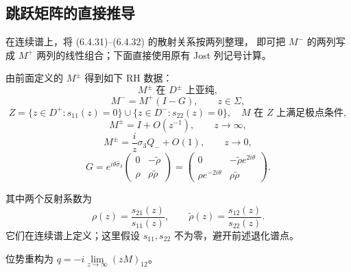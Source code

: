 \documentclass[lang=cn,scheme=chinese,mode=simple,device=normal,color=blue,
math=cm,thmcnt=section,12pt]{elegantbook}
\newcommand{\eqq}[2]{\tag{#1}\label{eq:#1}#2}
\begin{document}
\subsection{跳跃矩阵的直接推导}
在连续谱上，将 (6.4.31)--(6.4.32) 的散射关系按两列整理，
即可把 $M^-$ 的两列写成 $M^+$ 两列的线性组合；下面直接使用原有 Jost 列记号计算。
\setcounter{theorem}{2}
\begin{theorem}[简单极点的广义 RH 问题]
    由前面定义的 $M^\pm$ 得到如下 RH 数据：
    \begin{equation}\eqq{6.5.4}{M^\pm\text{ 在 }D^\pm\text{ 上亚纯},}\end{equation}
    \begin{equation}\eqq{6.5.5}{M^-=M^+(I-G),\qquad z\in\Sigma,}\end{equation}
    \begin{equation}\eqq{6.5.6}{Z=\{z\in D^+:s_{11}(z)=0\}\cup\{z\in D^-:s_{22}(z)=0\},
            \quad M\text{ 在 }Z\text{ 上满足极点条件},}\end{equation}
    \begin{equation}\eqq{6.5.7}{M^\pm=I+O(z^{-1}),\qquad z\to\infty,}\end{equation}
    \begin{equation}\eqq{6.5.8}{M^\pm=\dfrac{i}{z}\sigma_3Q_-+O(1),\qquad z\to0,}\end{equation}
    \begin{equation}\eqq{6.5.9}{G=e^{i\theta\widehat\sigma_3}
            \begin{pmatrix}0&-\widetilde\rho\\\rho&\rho\widetilde\rho\end{pmatrix}
            =\begin{pmatrix}0                  & -\widetilde\rho e^{2i\theta} \\
               \rho e^{-2i\theta} & \rho\widetilde\rho\end{pmatrix}.}\end{equation}

    其中两个反射系数为
    \[
        \rho(z)=\dfrac{s_{21}(z)}{s_{11}(z)},\qquad
        \widetilde\rho(z)=\dfrac{s_{12}(z)}{s_{22}(z)}.
    \]
    它们在连续谱上定义；这里假设 $s_{11},s_{22}$ 不为零，避开前述退化谱点。

    位势重构为 $q=-i\displaystyle\lim\limits_{z\to\infty}(zM)_{12}$。
\end{theorem}
\end{document}
